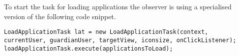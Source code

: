 To start the task for loading applications the observer is using a specialised version of the following code snippet.
\begin{lstlisting}[caption={A simplified code snippet for starting loading applications into a view.}, label={lst:simplelat}]
LoadApplicationTask lat = new LoadApplicationTask(context, currentUser, guardianUser, targetView, iconsize, onClickListener);
loadApplicationTask.execute(applicationsToLoad);
\end{lstlisting}
